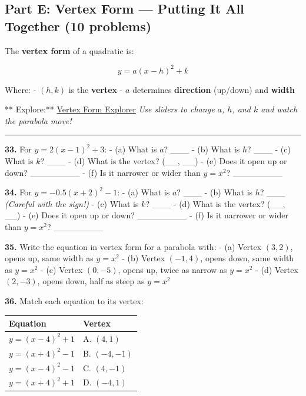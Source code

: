 \documentclass[
  11pt,
]{article}
\begin{document}
\hypertarget{part-e-vertex-form-putting-it-all-together-10-problems}{%
\subsection{Part E: Vertex Form --- Putting It All Together (10
problems)}\label{part-e-vertex-form-putting-it-all-together-10-problems}}

The \textbf{vertex form} of a quadratic is:

\[y = a(x - h)^2 + k\]

Where: - \((h, k)\) is the \textbf{vertex} - \(a\) determines
\textbf{direction} (up/down) and \textbf{width}

** Explore:** \href{https://www.geogebra.org/m/BUD9HAPR}{Vertex Form
Explorer} \emph{Use sliders to change \(a\), \(h\), and \(k\) and watch
the parabola move!}

\begin{center}\rule{0.5\linewidth}{0.5pt}\end{center}

\textbf{33.} For \(y = 2(x - 1)^2 + 3\): - (a) What is \(a\)? \_\_\_ -
(b) What is \(h\)? \_\_\_ - (c) What is \(k\)? \_\_\_ - (d) What is the
vertex? (\_\_, \_\_) - (e) Does it open up or down? \_\_\_\_\_\_\_\_ -
(f) Is it narrower or wider than \(y = x^2\)? \_\_\_\_\_\_\_\_

\textbf{34.} For \(y = -0.5(x + 2)^2 - 1\): - (a) What is \(a\)? \_\_\_
- (b) What is \(h\)? \_\_\_ \emph{(Careful with the sign!)} - (c) What
is \(k\)? \_\_\_ - (d) What is the vertex? (\_\_, \_\_) - (e) Does it
open up or down? \_\_\_\_\_\_\_\_ - (f) Is it narrower or wider than
\(y = x^2\)? \_\_\_\_\_\_\_\_

\textbf{35.} Write the equation in vertex form for a parabola with: -
(a) Vertex \((3, 2)\), opens up, same width as \(y = x^2\) - (b) Vertex
\((-1, 4)\), opens down, same width as \(y = x^2\) - (c) Vertex
\((0, -5)\), opens up, twice as narrow as \(y = x^2\) - (d) Vertex
\((2, -3)\), opens down, half as steep as \(y = x^2\)

\textbf{36.} Match each equation to its vertex:

\begin{longtable}[]{@{}ll@{}}
\toprule\noalign{}
Equation & Vertex \\
\midrule\noalign{}
\endhead
\bottomrule\noalign{}
\endlastfoot
\(y = (x - 4)^2 + 1\) & A. \((4, 1)\) \\
\(y = (x + 4)^2 - 1\) & B. \((-4, -1)\) \\
\(y = (x - 4)^2 - 1\) & C. \((4, -1)\) \\
\(y = (x + 4)^2 + 1\) & D. \((-4, 1)\) \\
\end{longtable}
\end{document}
